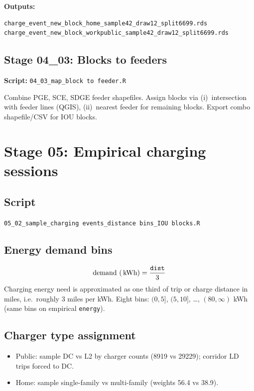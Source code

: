 \documentclass[11pt,a4paper]{article}
\begin{document}
\textbf{Outputs:}
\begin{lstlisting}
charge_event_new_block_home_sample42_draw12_split6699.rds
charge_event_new_block_workpublic_sample42_draw12_split6699.rds
\end{lstlisting}

\subsection{Stage 04\_03: Blocks to feeders}
\textbf{Script:} \texttt{04\_03\_map\_block to feeder.R}

Combine PGE, SCE, SDGE feeder shapefiles. Assign blocks via (i)~intersection with feeder lines (QGIS), (ii)~nearest feeder for remaining blocks. Export combo shapefile/CSV for IOU blocks.

\section{Stage 05: Empirical charging sessions}

\subsection{Script}
\texttt{05\_02\_sample\_charging events\_distance bins\_IOU blocks.R}

\subsection{Energy demand bins}
\begin{equation}
  \text{demand (\,kWh)} = \frac{\texttt{dist}}{3}
\end{equation}
\noindent Charging energy need is approximated as one third of trip or charge distance in miles, i.e.\ roughly 3 miles per kWh.
Eight bins: $(0,5]$, $(5,10]$, \ldots, $(80,\infty)$ kWh (same bins on empirical \texttt{energy}).

\subsection{Charger type assignment}
\begin{itemize}[noitemsep]
  \item Public: sample DC vs L2 by charger counts (8919 vs 29229); corridor LD trips forced to DC.
  \item Home: sample single-family vs multi-family (weights 56.4 vs 38.9).
\end{itemize}
\end{document}
